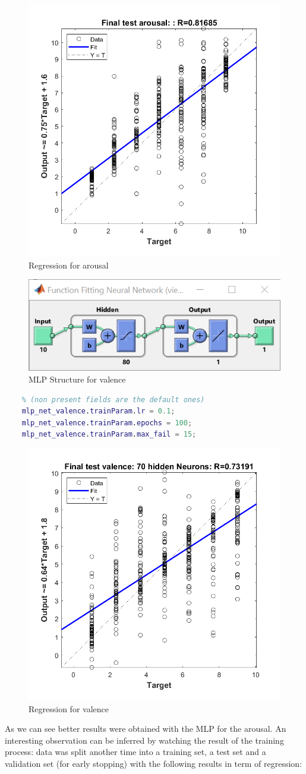 \begin{figure}[H]
	\centering
	\includegraphics[width=0.5\linewidth]{img/arousal_mlp_45_regression_with_testset.png} 
	\caption{Regression for arousal}
\end{figure}
\begin{figure}[H]
	\centering
	\includegraphics{img/valence_mlp_80.png} 
	\caption{MLP Structure for valence}
\end{figure}
\begin{lstlisting}[language=Matlab]
	% Configuration for training of the MLP for valence
	% (non present fields are the default ones)
	mlp_net_valence.trainParam.lr = 0.1; 
	mlp_net_valence.trainParam.epochs = 100;
	mlp_net_valence.trainParam.max_fail = 15;
\end{lstlisting}

\begin{figure}[H]
	\centering
	\includegraphics[width=0.5\linewidth]{img/valence_mlp_80_regression_with_testset.png} 
	\caption{Regression for valence}
\end{figure}
As we can see better results were obtained with the MLP for the arousal. An interesting observation can be inferred by watching the result of the training process: data was split another time into a training set, a test set and a validation set (for early stopping) with the following results in term of regression:

